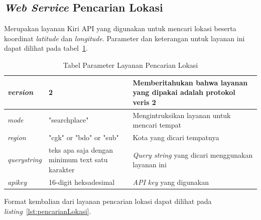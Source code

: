\subsection{\textit{Web Service} Pencarian Lokasi}
\label{subsec:Pencarian Lokasi Service}
\hspace{0.5cm} Merupakan layanan Kiri API yang digunakan untuk mencari lokasi beserta koordinat \textit{latitude} dan \textit{longitude}. Parameter dan keterangan untuk layanan ini dapat dilihat pada tabel~\ref{tab:pencarianLokasi}.

\begin{table}[H]
	\centering
		\begin{tabular}{ |p{2cm}|p{4cm}|p{8cm}| }
			\hline
			\textit{version} & 2 & Memberitahukan bahwa layanan yang dipakai adalah protokol veris 2 \\ \hline
			\textit{mode} & "searchplace" & Mengintruksikan layanan untuk mencari tempat \\ \hline
			\textit{region} & "cgk" or "bdo" or "sub" & Kota yang dicari tempatnya \\ \hline
			\textit{querystring} & teks apa saja dengan minimum text satu karakter & \textit{Query string} yang dicari menggunakan  layanan ini \\ \hline
			\textit{apikey} & 16-digit heksadesimal & \textit{API key} yang digunakan \\ \hline
			\hline
		\end{tabular}
	\caption{Tabel Parameter Layanan Pencarian Lokasi}
	\label{tab:pencarianLokasi}
\end{table}

\vspace{5mm}
Format kembalian dari layanan pencarian lokasi dapat dilihat pada \textit{listing}~\ref{lst:pencarianLokasi}.

